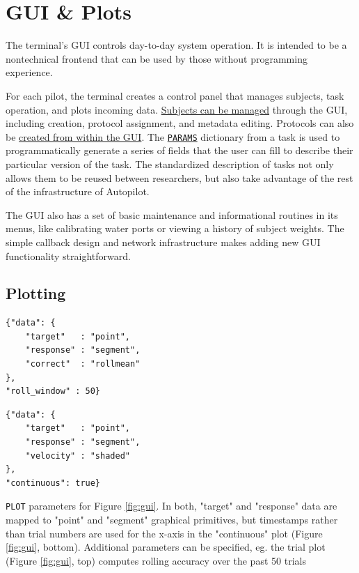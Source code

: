 \section{GUI \& Plots}
\label{sec:ui}

The terminal's GUI controls day-to-day system operation. It is intended to be a nontechnical frontend that can be used by those without programming experience. 

For each pilot, the terminal creates a control panel that manages subjects, task operation, and plots incoming data. \href{http://docs.auto-pi-lot.com/guide.training.html#creating-a-subject}{Subjects can be managed} through the GUI, including creation, protocol assignment, and metadata editing. Protocols can also be \href{http://docs.auto-pi-lot.com/guide.training.html#creating-a-protocol}{created from within the GUI}. The \hyperref[sec:taskcomponents]{\texttt{PARAMS}} dictionary from a task is used to programmatically generate a series of fields that the user can fill to describe their particular version of the task. The standardized description of tasks not only allows them to be reused between researchers, but also take advantage of the rest of the infrastructure of Autopilot.

The GUI also has a set of basic maintenance and informational routines in its menus, like calibrating water ports or viewing a history of subject weights. The simple callback design and network infrastructure makes adding new GUI functionality straightforward.

\subsection{Plotting}
\label{sec:plotting}

\begin{marginfigure}[-5.5cm]
\begin{verbatim}
{"data": {
    "target"   : "point",
    "response" : "segment",
    "correct"  : "rollmean"
},
"roll_window" : 50}
\end{verbatim}
\begin{verbatim}
{"data": {
    "target"   : "point",
    "response" : "segment",
    "velocity" : "shaded"
},
"continuous": true}
\end{verbatim}
\caption{\texttt{PLOT} parameters for Figure \ref{fig:gui}. In both, "target" and "response" data are mapped to "point" and "segment" graphical primitives, but timestamps rather than trial numbers are used for the x-axis in the "continuous" plot (Figure \ref{fig:gui}, bottom). Additional parameters can be specified, eg. the trial plot (Figure \ref{fig:gui}, top) computes rolling accuracy over the past 50 trials}
\label{fig:plotparams}
\end{marginfigure}

